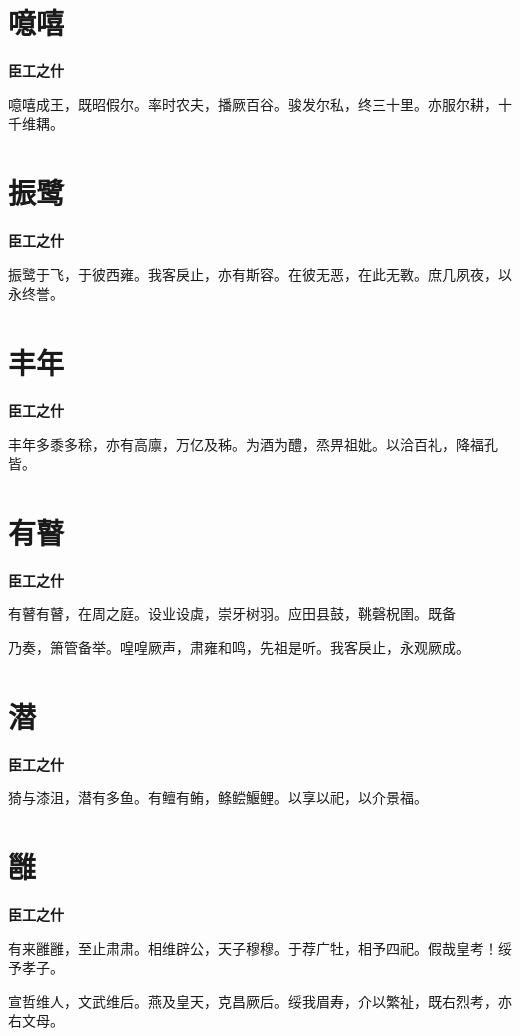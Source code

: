 \documentclass[12pt,a4paper]{ctexbook}
\begin{document}
\section{噫嘻}
\textbf{臣工之什}\par\vspace{0.5em}
噫嘻成王，既昭假尔。率时农夫，播厥百谷。骏发尔私，终三十里。亦服尔耕，十千维耦。\par

\section{振鹭}
\textbf{臣工之什}\par\vspace{0.5em}
振鹭于飞，于彼西雍。我客戾止，亦有斯容。在彼无恶，在此无斁。庶几夙夜，以永终誉。\par

\section{丰年}
\textbf{臣工之什}\par\vspace{0.5em}
丰年多黍多稌，亦有高廪，万亿及秭。为酒为醴，烝畀祖妣。以洽百礼，降福孔皆。\par

\section{有瞽}
\textbf{臣工之什}\par\vspace{0.5em}
有瞽有瞽，在周之庭。设业设虡，崇牙树羽。应田县鼓，鞉磬柷圉。既备\par
乃奏，箫管备举。喤喤厥声，肃雍和鸣，先祖是听。我客戾止，永观厥成。\par

\section{潜}
\textbf{臣工之什}\par\vspace{0.5em}
猗与漆沮，潜有多鱼。有鳣有鲔，鲦鲿鰋鲤。以享以祀，以介景福。\par

\section{雝}
\textbf{臣工之什}\par\vspace{0.5em}
有来雝雝，至止肃肃。相维辟公，天子穆穆。于荐广牡，相予四祀。假哉皇考！绥予孝子。\par
宣哲维人，文武维后。燕及皇天，克昌厥后。绥我眉寿，介以繁祉，既右烈考，亦右文母。\par
\end{document}
